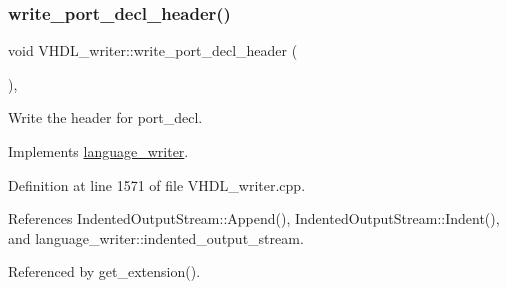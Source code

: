 \subsubsection{\texorpdfstring{write\+\_\+port\+\_\+decl\+\_\+header()}{write\_port\_decl\_header()}}
{\footnotesize\ttfamily void V\+H\+D\+L\+\_\+writer\+::write\+\_\+port\+\_\+decl\+\_\+header (\begin{DoxyParamCaption}{ }\end{DoxyParamCaption})\hspace{0.3cm}{\ttfamily [override]}, {\ttfamily [virtual]}}



Write the header for port\+\_\+decl. 



Implements \hyperlink{classlanguage__writer_a89c790a77df81030bd359a1adcaae433}{language\+\_\+writer}.



Definition at line 1571 of file V\+H\+D\+L\+\_\+writer.\+cpp.



References Indented\+Output\+Stream\+::\+Append(), Indented\+Output\+Stream\+::\+Indent(), and language\+\_\+writer\+::indented\+\_\+output\+\_\+stream.



Referenced by get\+\_\+extension().

